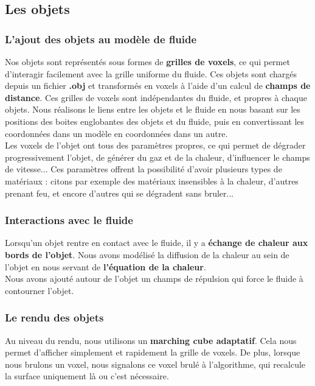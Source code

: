 \documentclass[a4paper,10pt]{article}
\begin{document}
\subsection{Les objets}
\subsubsection{L'ajout des objets au modèle de fluide}
Nos objets sont représentés sous formes de \textbf{grilles de voxels}, ce qui 
permet d'interagir facilement avec la grille uniforme du fluide. Ces objets sont
chargés depuis un fichier \textbf{.obj} et transformés en voxels à l'aide 
d'un calcul de \textbf{champs de distance}.
Ces grilles de voxels sont indépendantes du fluide, et propres à chaque objets.
Nous réalisons le liens entre les objets et le fluide en nous basant 
sur les positions des boites englobantes des objets et du fluide,
puis en convertissant les coordonnées dans un modèle en coordonnées dans un autre.\\
Les voxels de l'objet ont tous des paramètres propres, ce qui permet
de dégrader progressivement l'objet, de générer du gaz et de la chaleur,
d'influencer le champs de vitesse... Ces paramètres offrent la possibilité d'avoir
plusieurs types de matériaux : citons par exemple des matériaux insensibles à
la chaleur, d'autres prenant feu, et encore d'autres qui se dégradent sans bruler...\\


\subsubsection{Interactions avec le fluide}
Lorsqu'un objet rentre en contact avec le fluide, il y a \textbf{échange de chaleur aux
bords de l'objet}. Nous avons modélisé la diffusion de la chaleur au sein
de l'objet en nous servant de \textbf{l'équation de la chaleur}.\\
Nous avons ajouté autour de l'objet un champs de répulsion qui force le fluide
à contourner l'objet.

\subsubsection{Le rendu des objets}
Au niveau du rendu, nous utilisons un \textbf{marching cube adaptatif}. Cela nous permet
d'afficher simplement et rapidement la grille de voxels. De plus, lorsque nous brulons un voxel,
nous signalons ce voxel brulé à l'algorithme, qui recalcule la surface uniquement 
là ou c'est nécessaire.
\end{document}

